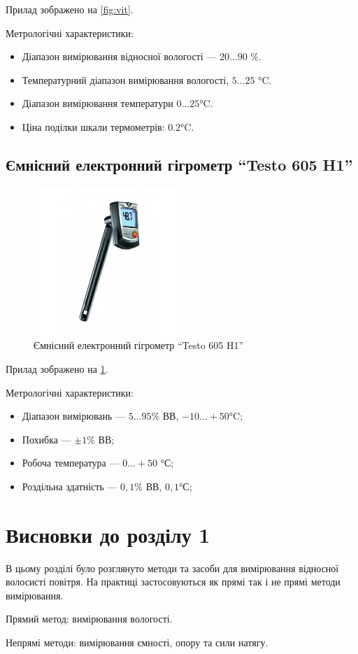Прилад зображено на \ref{fig:vit}.

Метрологічні характеристики:
\begin{itemize}
\item Діапазон вимірювання відносної вологості --- $20 \ldots 90$ \%.
\item Температурний діапазон вимірювання вологості,  $5 \ldots 25$ °C.
\item Діапазон вимірювання температури $0 \ldots 25$°C.
\item Ціна поділки шкали термометрів:  $0.2$°C.
\end{itemize}

\subsection{Ємнісний електронний гігрометр ``Testo 605 H1''}
\begin{figure}[!ht]
\centering
\includegraphics[width=0.5\textwidth]{./images/testo.jpg}
\caption{Ємнісний електронний гігрометр ``Testo 605 H1''}
\label{fig:testo}
\end{figure}

Прилад зображено на \ref{fig:testo}.

Метрологічні характеристики:
\begin{itemize}
\item Діапазон вимірювань --- $5 \ldots 95 \%$ ВВ,  $-10 \ldots +50$°C;
\item Похибка --- $\pm 1\%$ ВВ;
\item Робоча температура ---  $0 \ldots +50$ °С;
\item Роздільна здатність --- $0,1 \%$ ВВ, $0,1$°С;
\end{itemize}


\section*{Висновки до розділу 1}

В цьому розділі було розглянуто методи та засоби для вимірювання відносної волосисті повітря.
На практиці застосовуються як прямі так і не прямі методи вимірювання.

Прямий метод: вимірювання вологості.

Непрямі методи: вимірювання ємності, опору та сили натягу.
